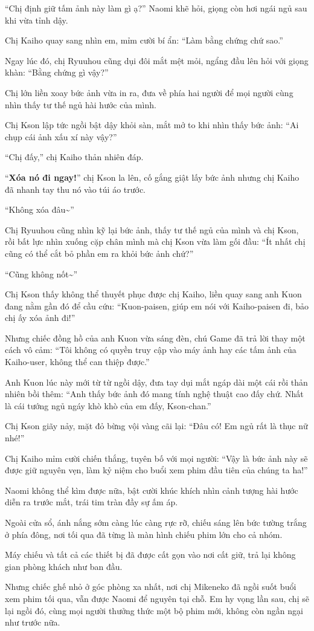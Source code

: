 \documentclass[../main.tex]{subfiles}
\begin{document}
``Chị định giữ tấm ảnh này làm gì ạ?'' Naomi khẽ hỏi, giọng còn hơi ngái ngủ sau khi vừa tỉnh dậy.

Chị Kaiho quay sang nhìn em, mỉm cười bí ẩn: ``Làm bằng chứng chứ sao.''

Ngay lúc đó, chị Ryuuhou cũng dụi đôi mắt mệt mỏi, ngẩng đầu lên hỏi với giọng khàn: ``Bằng chứng gì vậy?''

Chị lớn liền xoay bức ảnh vừa in ra, đưa về phía hai người để mọi người cùng nhìn thấy tư thế ngủ hài hước của mình.

Chị Kson lập tức ngồi bật dậy khỏi sàn, mắt mở to khi nhìn thấy bức ảnh: ``Ai chụp cái ảnh xấu xí này vậy?''

``Chị đấy,'' chị Kaiho thản nhiên đáp.

``\textbf{Xóa nó đi ngay!}'' chị Kson la lên, cố gắng giật lấy bức ảnh nhưng chị Kaiho đã nhanh tay thu nó vào túi áo trước.

``Không xóa đâu\~{}''

Chị Ryuuhou cũng nhìn kỹ lại bức ảnh, thấy tư thế ngủ của mình và chị Kson, rồi bất lực nhìn xuống cặp chân mình mà chị Kson vừa làm gối đầu: ``Ít nhất chị cũng có thể cắt bỏ phần em ra khỏi bức ảnh chứ?''

``Cũng không nốt\~{}''

Chị Kson thấy không thể thuyết phục được chị Kaiho, liền quay sang anh Kuon đang nằm gần đó để cầu cứu: ``Kuon-paisen, giúp em nói với Kaiho-paisen đi, bảo chị ấy xóa ảnh đi!''

Nhưng chiếc đồng hồ của anh Kuon vừa sáng đèn, chú Game đã trả lời thay một cách vô cảm: ``Tôi không có quyền truy cập vào máy ảnh hay các tấm ảnh của Kaiho-user, không thể can thiệp được.''

Anh Kuon lúc này mới từ từ ngồi dậy, đưa tay dụi mắt ngáp dài một cái rồi thản nhiên bồi thêm: ``Anh thấy bức ảnh đó mang tính nghệ thuật cao đấy chứ. Nhất là cái tướng ngủ ngáy khò khò của em đấy, Kson-chan.''

Chị Kson giãy nảy, mặt đỏ bừng vội vàng cãi lại: ``Đâu có! Em ngủ rất là thục nữ nhé!''

Chị Kaiho mỉm cười chiến thắng, tuyên bố với mọi người: ``Vậy là bức ảnh này sẽ được giữ nguyên vẹn, làm kỷ niệm cho buổi xem phim đầu tiên của chúng ta ha!''

Naomi không thể kìm được nữa, bật cười khúc khích nhìn cảnh tượng hài hước diễn ra trước mắt, trái tim tràn đầy sự ấm áp.

Ngoài cửa sổ, ánh nắng sớm càng lúc càng rực rỡ, chiếu sáng lên bức tường trắng ở phía đông, nơi tối qua đã từng là màn hình chiếu phim lớn cho cả nhóm.

Máy chiếu và tất cả các thiết bị đã được cất gọn vào nơi cất giữ, trả lại không gian phòng khách như ban đầu.

Nhưng chiếc ghế nhỏ ở góc phòng xa nhất, nơi chị Mikeneko đã ngồi suốt buổi xem phim tối qua, vẫn được Naomi để nguyên tại chỗ. Em hy vọng lần sau, chị sẽ lại ngồi đó, cùng mọi người thưởng thức một bộ phim mới, không còn ngần ngại như trước nữa.
\end{document}
